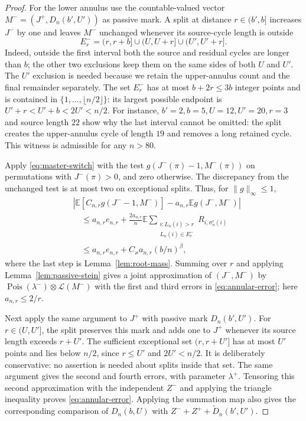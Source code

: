 \documentclass[11pt]{article}
\numberwithin{equation}{section}
\newcommand{\E}{\mathbb E}
\newcommand{\Pois}{\operatorname{Pois}}
\newcommand{\cL}{\mathcal L}
\theoremstyle{definition}
\theoremstyle{remark}
\begin{document}
\begin{proof}
For the lower annulus use the countable-valued vector
$M^-=(J^+,D_n(b',U'))$ as passive mark.
A split at distance $r\in(b',b]$ increases $J^-$ by one and leaves
$M^-$ unchanged whenever its source-cycle length is outside
\[
 E_r^-=(r,r+b]\cup(U,U+r]\cup(U',U'+r].
\]
Indeed, outside the first interval both the source and residual cycles are
longer than $b$; the other two exclusions keep them on the same sides
of both $U$ and $U'$.  The $U'$ exclusion is needed because we retain
the upper-annulus count and the final remainder separately.
The set $E_r^-$ has at most $b+2r\le3b$ integer points and is contained in
$\{1,\ldots,\lfloor n/2\rfloor\}$: its largest possible endpoint is
$U'+r<U'+b<2U'<n/2$.
For instance, $b'=2,b=5,U=12,U'=20,r=3$ and source length $22$
show why the last interval cannot be omitted: the split creates the
upper-annulus cycle of length $19$ and removes a long retained cycle.
This witness is admissible for any $n>80$.

Apply \eqref{eq:master-switch} with the test
$g(J^-(\pi)-1,M^-(\pi))$ on permutations with $J^-(\pi)>0$, and zero
otherwise.  The discrepancy from the unchanged test is at most two on
exceptional splits.  Thus, for $\|g\|_\infty\le1$,
\begin{align*}
 &\left|\E[C_{n,r}g(J^--1,M^-)]-a_{n,r}\E g(J^-,M^-)\right|\\
 &\quad\le a_{n,r}e_{n,r}
 +\frac{2a_{n,r}}n
    \E\sum_{\substack{i:L_n(i)>r\\L_n(i)\in E_r^-}}
                  R_{i,\sigma_n^r(i)}\\
 &\quad\le a_{n,r}e_{n,r}+C_\varkappa a_{n,r}(b/n)^\beta,
\end{align*}
where the last step is Lemma~\ref{lem:root-mass}.
Summing over $r$ and applying Lemma~\ref{lem:passive-stein} gives a joint
approximation of $(J^-,M^-)$ by
$\Pois(\lambda^-)\otimes\cL(M^-)$ with the first and third errors in
\eqref{eq:annular-error}; here $a_{n,r}\le2/r$.

Next apply the same argument to $J^+$ with passive mark $D_n(b',U')$.
For $r\in(U,U']$, the split preserves this mark and adds one to $J^+$
whenever its source length exceeds $r+U'$.
The sufficient exceptional set $(r,r+U']$ has at most $U'$ points and lies
below $n/2$, since $r\le U'$ and $2U'<n/2$.  It is deliberately
conservative: no assertion is needed about splits inside that set.  The same argument gives the second and fourth
errors, with parameter $\lambda^+$.  Tensoring this second approximation
with the independent $Z^-$ and applying the triangle inequality proves
\eqref{eq:annular-error}.  Applying the summation map also gives the
corresponding comparison of $D_n(b,U)$ with
$Z^-+Z^++\widetilde D_n(b',U')$.
\end{proof}
\end{document}
